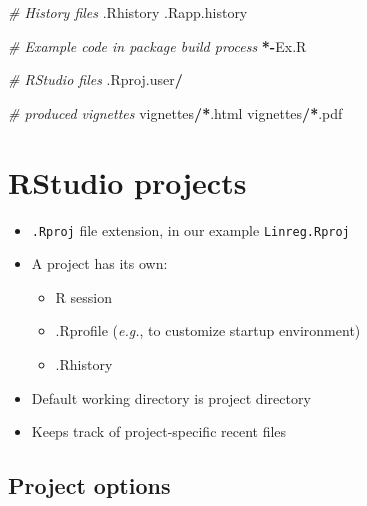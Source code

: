 \documentclass[]{book}
\newenvironment{Shaded}{\begin{snugshade}}{\end{snugshade}}
\newcommand{\CommentTok}[1]{\textcolor[rgb]{0.56,0.35,0.01}{\textit{#1}}}
\newcommand{\OperatorTok}[1]{\textcolor[rgb]{0.81,0.36,0.00}{\textbf{#1}}}
\newcommand{\ErrorTok}[1]{\textcolor[rgb]{0.64,0.00,0.00}{\textbf{#1}}}
\newcommand{\NormalTok}[1]{#1}
\providecommand{\tightlist}{%
  \setlength{\itemsep}{0pt}\setlength{\parskip}{0pt}}
\theoremstyle{definition}
\theoremstyle{definition}
\theoremstyle{definition}
\theoremstyle{remark}
\begin{document}
\begin{Shaded}
\begin{Highlighting}[]
\CommentTok{# History files}
\NormalTok{.Rhistory}
\NormalTok{.Rapp.history}

\CommentTok{# Example code in package build process}
\OperatorTok{*-}\NormalTok{Ex.R}

\CommentTok{# RStudio files}
\NormalTok{.Rproj.user}\OperatorTok{/}

\CommentTok{# produced vignettes}
\NormalTok{vignettes}\OperatorTok{/}\ErrorTok{*}\NormalTok{.html}
\NormalTok{vignettes}\OperatorTok{/}\ErrorTok{*}\NormalTok{.pdf}
\end{Highlighting}
\end{Shaded}

\section{RStudio projects}\label{rstudio-projects}

\begin{itemize}
\item
  \texttt{.Rproj} file extension, in our example \texttt{Linreg.Rproj}
\item
  A project has its own:

  \begin{itemize}
  \tightlist
  \item
    R session
  \item
    .Rprofile (\emph{e.g.}, to customize startup environment)
  \item
    .Rhistory
  \end{itemize}
\item
  Default working directory is project directory
\item
  Keeps track of project-specific recent files
\end{itemize}

\subsection{Project options}\label{project-options}
\end{document}
